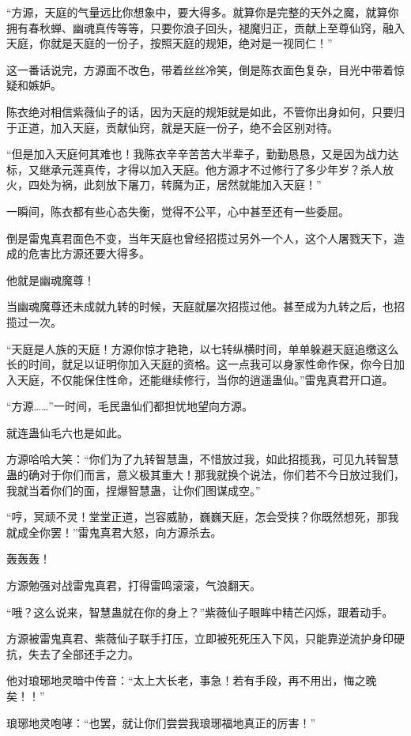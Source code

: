 \begin{this_body}
“方源，天庭的气量远比你想象中，要大得多。就算你是完整的天外之魔，就算你拥有春秋蝉、幽魂真传等等，只要你浪子回头，褪魔归正，贡献上至尊仙窍，融入天庭，你就是天庭的一份子，按照天庭的规矩，绝对是一视同仁！”

这一番话说完，方源面不改色，带着丝丝冷笑，倒是陈衣面色复杂，目光中带着惊疑和嫉妒。

陈衣绝对相信紫薇仙子的话，因为天庭的规矩就是如此，不管你出身如何，只要归于正道，加入天庭，贡献仙窍，就是天庭一份子，绝不会区别对待。

“但是加入天庭何其难也！我陈衣辛辛苦苦大半辈子，勤勤恳恳，又是因为战力达标，又继承元莲真传，才得以加入天庭。他方源才不过修行了多少年岁？杀人放火，四处为祸，此刻放下屠刀，转魔为正，居然就能加入天庭！”

一瞬间，陈衣都有些心态失衡，觉得不公平，心中甚至还有一些委屈。

倒是雷鬼真君面色不变，当年天庭也曾经招揽过另外一个人，这个人屠戮天下，造成的危害比方源还要大得多。

他就是幽魂魔尊！

当幽魂魔尊还未成就九转的时候，天庭就屡次招揽过他。甚至成为九转之后，也招揽过一次。

“天庭是人族的天庭！方源你惊才艳艳，以七转纵横时间，单单躲避天庭追缴这么长的时间，就足以证明你加入天庭的资格。这一点我可以身家性命作保，你今日加入天庭，不仅能保住性命，还能继续修行，当你的逍遥蛊仙。”雷鬼真君开口道。

“方源……”一时间，毛民蛊仙们都担忧地望向方源。

就连蛊仙毛六也是如此。

方源哈哈大笑：“你们为了九转智慧蛊，不惜放过我，如此招揽我，可见九转智慧蛊的确对于你们而言，意义极其重大！那我就换个说法，你们若不今日放过我们，我就当着你们的面，捏爆智慧蛊，让你们图谋成空。”

“哼，冥顽不灵！堂堂正道，岂容威胁，巍巍天庭，怎会受挟？你既然想死，那我就成全你罢！”雷鬼真君大怒，向方源杀去。

轰轰轰！

方源勉强对战雷鬼真君，打得雷鸣滚滚，气浪翻天。

“哦？这么说来，智慧蛊就在你的身上？”紫薇仙子眼眸中精芒闪烁，跟着动手。

方源被雷鬼真君、紫薇仙子联手打压，立即被死死压入下风，只能靠逆流护身印硬抗，失去了全部还手之力。

他对琅琊地灵暗中传音：“太上大长老，事急！若有手段，再不用出，悔之晚矣！！”

琅琊地灵咆哮：“也罢，就让你们尝尝我琅琊福地真正的厉害！”


\end{this_body}
